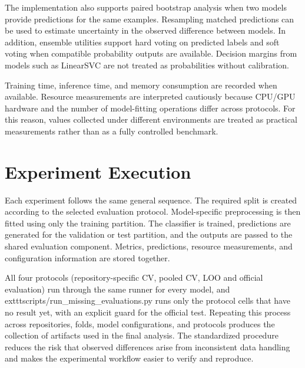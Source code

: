 The implementation also supports paired bootstrap analysis when two models provide predictions for the same examples. Resampling matched predictions can be used to estimate uncertainty in the observed difference between models. In addition, ensemble utilities support hard voting on predicted labels and soft voting when compatible probability outputs are available. Decision margins from models such as LinearSVC are not treated as probabilities without calibration.

Training time, inference time, and memory consumption are recorded when available. Resource measurements are interpreted cautiously because CPU/GPU hardware and the number of model-fitting operations differ across protocols. For this reason, values collected under different environments are treated as practical measurements rather than as a fully controlled benchmark.

\section{Experiment Execution}
Each experiment follows the same general sequence. The required split is created according to the selected evaluation protocol. Model-specific preprocessing is then fitted using only the training partition. The classifier is trained, predictions are generated for the validation or test partition, and the outputs are passed to the shared evaluation component. Metrics, predictions, resource measurements, and configuration information are stored together.

All four protocols (repository-specific CV, pooled CV, LOO and official evaluation) run through the same runner for every model, and 	exttt{scripts/run\_missing\_evaluations.py} runs only the protocol cells that have no result yet, with an explicit guard for the official test. Repeating this process across repositories, folds, model configurations, and protocols produces the collection of artifacts used in the final analysis. The standardized procedure reduces the risk that observed differences arise from inconsistent data handling and makes the experimental workflow easier to verify and reproduce.
